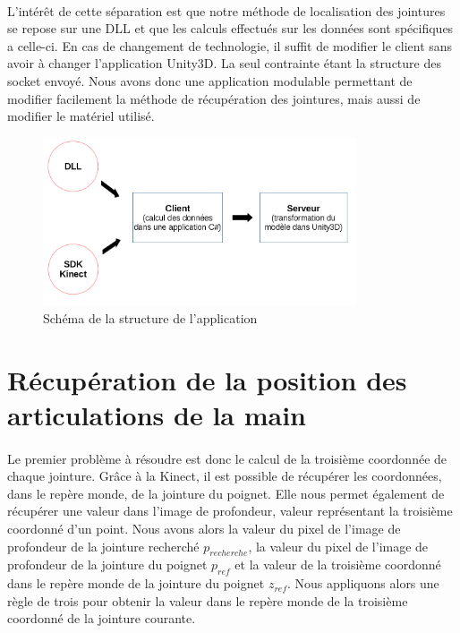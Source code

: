 \paragraph{}
L'intérêt de cette séparation est que notre méthode de localisation des jointures se repose sur une 
DLL et que les calculs effectués sur les données sont spécifiques a celle-ci. En cas de changement de 
technologie, il suffit de modifier le client sans avoir à changer l'application Unity3D. La seul contrainte
étant la structure des socket envoyé. Nous avons donc une application modulable permettant de modifier 
facilement la méthode de récupération des jointures, mais aussi de modifier le matériel utilisé.

\begin{figure}[H]
  \label{schema_application}
  \begin{center}
    \includegraphics[width=350px]{images/schemaAppli.png}
    \caption{Schéma de la structure de l'application}
  \end{center}
\end{figure}

\section{Récupération de la position des articulations de la main}
\label{Real_get_art}
\paragraph{}
Le premier problème à résoudre est donc le calcul de la troisième coordonnée de chaque jointure. Grâce à la Kinect,
il est possible de récupérer les coordonnées, dans le repère monde, de la jointure du poignet. Elle nous permet
également de récupérer une valeur dans l'image de profondeur, valeur représentant la troisième coordonné d'un point.
Nous avons alors la valeur du pixel de l'image de profondeur de la jointure recherché $p_{recherche}$, la valeur
du pixel de l'image de profondeur de la jointure du poignet $p_{ref}$ et la valeur de la troisième coordonné dans 
le repère monde de la jointure du poignet $z_{ref}$. Nous appliquons alors une règle de trois pour obtenir 
la valeur dans le repère monde de la troisième coordonné de la jointure courante.

